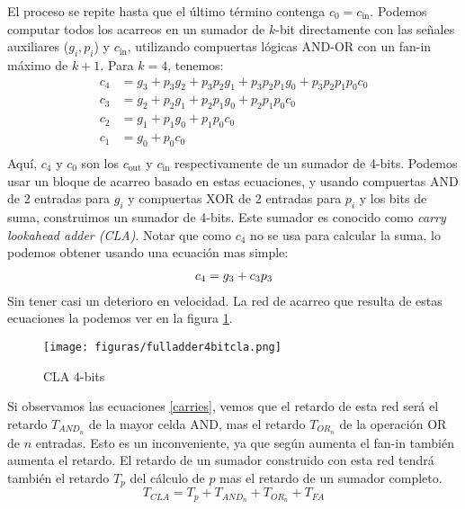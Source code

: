 El proceso se repite hasta que el último término contenga $c_0 = c_{\text{in}}$. Podemos computar todos los acarreos en un sumador de $k$-bit directamente con las señales auxiliares ($g_i,p_i$) y $c_{\text{in}}$, utilizando compuertas lógicas AND-OR con un fan-in máximo de $k+1$. Para $k=4$, tenemos:
\begin{equation}
\begin{align}
c_4 &=g_{3} +p_{3}g_{2}+p_{3}p_{2}g_{1}+p_{3}p_{2}p_{1}g_{0}+p_{3}p_{2}p_{1}p_{0}c_{0}\\
c_3 &=g_{2} +p_{2}g_{1}+p_{2}p_{1}g_{0}+p_2p_1p_0c_0\\
c_2 &=g_{1} +p_{1}g_{0}+p_{1}p_{0}c_{0}\\
c_1 &=g_0+p_0c_0\\
\label{carries}	
\end{align}
\end{equation}	
Aquí, $c_4$ y $c_0$ son los $c_{\text{out}}$ y $c_{\text{in}}$ respectivamente de un sumador de 4-bits. Podemos usar un bloque de acarreo basado en estas ecuaciones, y usando compuertas AND de 2 entradas para $g_i$ y compuertas XOR de 2 entradas para $p_i$ y los bits de suma, construimos un sumador de 4-bits. Este sumador es conocido como \emph{carry lookahead adder (CLA)}. Notar que como $c_4$ no se usa para calcular la suma, lo podemos obtener usando una ecuación mas simple:
\begin{equation}
\begin{align}
c_4 = g_3 + c_3p_3 \notag
\end{align}
\end{equation}
Sin tener casi un deterioro en velocidad. La red de acarreo que resulta de estas ecuaciones la podemos ver en la figura \ref{cla4bits}.
\begin{figure}[h]
  \centering
\texttt{[image: figuras/fulladder4bitcla.png]}
\vspace{-1pt}
  \caption{CLA 4-bits}
  \label{cla4bits}
\vspace{-15pt}
\end{figure}

Si observamos las ecuaciones \ref{carries}, vemos que el retardo de esta red será el retardo $T_{AND_n}$ de la mayor celda AND, mas el retardo $T_{OR_n}$ de la operación OR de $n$ entradas. Esto es un inconveniente, ya que según aumenta el fan-in también aumenta el retardo. El retardo de un sumador construido con esta red tendrá también el retardo $T_p$ del cálculo de $p$ mas el retardo de un sumador completo.
\begin{equation}
T_{CLA} = T_p + T_{AND_n} + T_{OR_n} + T_{FA}
\end{equation}

